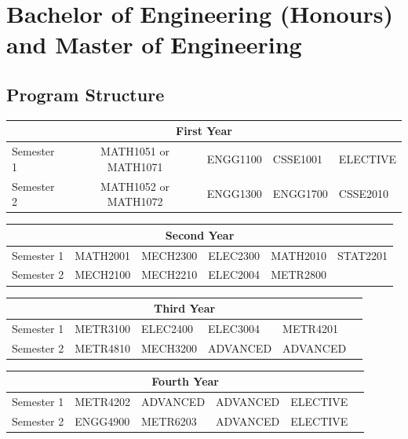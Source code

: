 \documentclass[a4paper,12pt]{report}
\begin{document}
\newpage

\section{Bachelor of Engineering (Honours) and Master of Engineering}
\subsection{Program Structure}
\renewcommand{\arraystretch}{1.5}
\begin{table}[H]
    \centering
    \begin{tabular}{| m{6em} | m{5em} m{5em} m{5em} m{5em} m{5em} |}
        \hline
        \multicolumn{6}{|c|}{\bfseries First Year} \\
        \hline
        Semester 1 & \multicolumn{2}{c}{MATH1051 or MATH1071} & ENGG1100 & CSSE1001 & ELECTIVE \\
        Semester 2 & \multicolumn{2}{c}{MATH1052 or MATH1072} & ENGG1300 & ENGG1700 & CSSE2010 \\
        \hline
    \end{tabular}
\end{table}
\begin{table}[H]
    \centering
    \begin{tabular}{| m{6em} | m{5em} m{5em} m{5em} m{5em} m{5em} |}
        \hline
        \multicolumn{6}{|c|}{\bfseries Second Year} \\
        \hline
        Semester 1 & MATH2001 & MECH2300 & ELEC2300 & MATH2010 & STAT2201 \\
        Semester 2 & MECH2100 & MECH2210 & ELEC2004 & METR2800 & \\
        \hline
    \end{tabular}
\end{table}
\begin{table}[H]
    \centering
    \begin{tabular}{| m{6em} | m{5em} m{5em} m{5em} m{5em} m{5em} |}
        \hline
        \multicolumn{6}{|c|}{\bfseries Third Year} \\
        \hline
        Semester 1 & METR3100 & ELEC2400 & ELEC3004 & METR4201 & \\
        Semester 2 & METR4810 & MECH3200 & ADVANCED & ADVANCED & \\
        \hline
    \end{tabular}
\end{table}
\begin{table}[H]
    \centering
    \begin{tabular}{| m{6em} | m{5em} m{5em} m{5em} m{5em} m{5em} |}
        \hline
        \multicolumn{6}{|c|}{\bfseries Fourth Year} \\
        \hline
        Semester 1 & METR4202 & ADVANCED & ADVANCED & ELECTIVE & \\
        Semester 2 & ENGG4900 & METR6203 & ADVANCED & ELECTIVE & \\
        \hline
    \end{tabular}
\end{table}
\end{document}
